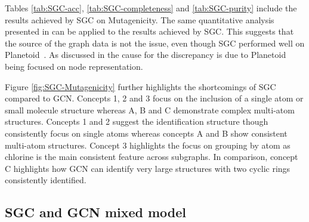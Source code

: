 Tables \ref{tab:SGC-acc}, \ref{tab:SGC-completeness} and \ref{tab:SGC-purity} include the results achieved by SGC on Mutagenicity.
The same quantitative analysis presented in  can be applied to the results achieved by SGC.
This suggests that the source of the graph data is not the issue, even though SGC performed well on Planetoid~\cite{Fey/Lenssen/2019}.
As discussed in  the cause for the discrepancy is due to Planetoid~\cite{Fey/Lenssen/2019} being focused on node representation.

Figure \ref{fig:SGC-Mutagenicity} further highlights the shortcomings of SGC compared to GCN.
Concepts 1, 2 and 3 focus on the inclusion of a single atom or small molecule structure whereas A, B and C demonstrate complex multi-atom structures.
Concepts 1 and 2 suggest the identification structure though consistently focus on single atoms whereas concepts A and B show consistent multi-atom structures.
Concept 3 highlights the focus on grouping by atom as chlorine is the main consistent feature across subgraphs.
In comparison, concept C highlights how GCN can identify very large structures with two cyclic rings consistently identified.

\subsection{SGC and GCN mixed model}
\label{sec:SGCN}

